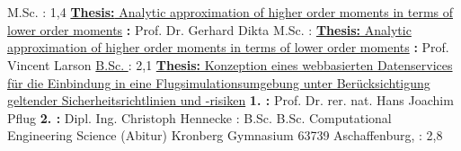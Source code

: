 \section{\education}\label{sec:education}
%
{M.Sc. \ami}
{\newline{}\fhac}
{\fhacloc}
{\newline{}\grade: 1,4}
{\href{https://github.com/svbergmann/Masterthesis/blob/master/out/Masterthesis.pdf}{\textbf{Thesis:} Analytic approximation of higher order moments in terms of lower order moments} \newline{} \textbf{\supervisor:} Prof. Dr. Gerhard Dikta}
%
{M.Sc. \mathematics}
{\newline{}\uwm}
{\uwmloc}
{\newline{}\grade: \uwmgrade}
{\href{https://github.com/svbergmann/Masterthesis/blob/master/out/Masterthesis.pdf}{\textbf{Thesis:} Analytic approximation of higher order moments in terms of lower order moments} \newline{} \textbf{\supervisor:} Prof. Vincent Larson}
%
{\hyperlink{certificates/Bachelorzeugnis_compressed.pdf.1}{B.Sc. \ami}}
{\newline{}\fhac}
{\fhacloc}
{\newline{}\grade: 2,1}
{\href{https://github.com/svbergmann/Bachelorarbeit/tree/master/out}{\textbf{Thesis:} Konzeption eines webbasierten Datenservices für die Einbindung in eine Flugsimulationsumgebung unter Berücksichtigung geltender Sicherheitsrichtlinien und -risiken} \newline{} \textbf{1. \supervisor:} Prof. Dr. rer. nat. Hans Joachim Pflug \newline{}\textbf{2. \supervisor:} Dipl. Ing. Christoph Hennecke}
%
{\hyperlink{certificates/IHKPruefungszeugnisCompressed.pdf.1}{\matse}}
{\newline{}\cae}
{\caeloc}
{\newline{}\grade: \satisfactory}
{} %
%
{B.Sc. \mechanicalengineering}
{\newline{}\rwthac}
{\rwthacloc}
{\newline{}\withoutdegree}
{} %
%
{B.Sc. Computational Engineering Science}
{\newline{}\rwthac}
{\rwthacloc}
{\newline{}\withoutdegree}
{} %
%
{\highschooldiploma (Abitur)}
{\newline{}Kronberg Gymnasium}
{63739 Aschaffenburg, \germany}
{\newline{}\grade: 2,8}
{} %
